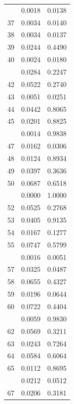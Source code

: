 \documentclass[
]{article}
\begin{document}
\begin{table}
\begin{tabular}[t]{lrr}
\addlinespace
36 & 0.0018 & 0.0138\\
37 & 0.0034 & 0.0140\\
38 & 0.0034 & 0.0137\\
39 & 0.0244 & 0.4490\\
40 & 0.0024 & 0.0180\\
\addlinespace
41 & 0.0284 & 0.2247\\
42 & 0.0522 & 0.2740\\
43 & 0.0051 & 0.0251\\
44 & 0.0442 & 0.8065\\
45 & 0.0201 & 0.8825\\
\addlinespace
46 & 0.0014 & 0.9838\\
47 & 0.0162 & 0.0306\\
48 & 0.0124 & 0.8934\\
49 & 0.0397 & 0.3636\\
50 & 0.0687 & 0.6518\\
\addlinespace
51 & 0.0000 & 1.0000\\
52 & 0.0525 & 0.2768\\
53 & 0.0405 & 0.9135\\
54 & 0.0167 & 0.1277\\
55 & 0.0747 & 0.5799\\
\addlinespace
56 & 0.0016 & 0.0051\\
57 & 0.0325 & 0.0487\\
58 & 0.0655 & 0.4327\\
59 & 0.0196 & 0.0644\\
60 & 0.0722 & 0.4404\\
\addlinespace
61 & 0.0059 & 0.9830\\
62 & 0.0569 & 0.3211\\
63 & 0.0243 & 0.7264\\
64 & 0.0584 & 0.6064\\
65 & 0.0112 & 0.8695\\
\addlinespace
66 & 0.0212 & 0.0512\\
67 & 0.0206 & 0.3181\\
\bottomrule
\end{tabular}
\end{table}
\end{document}
